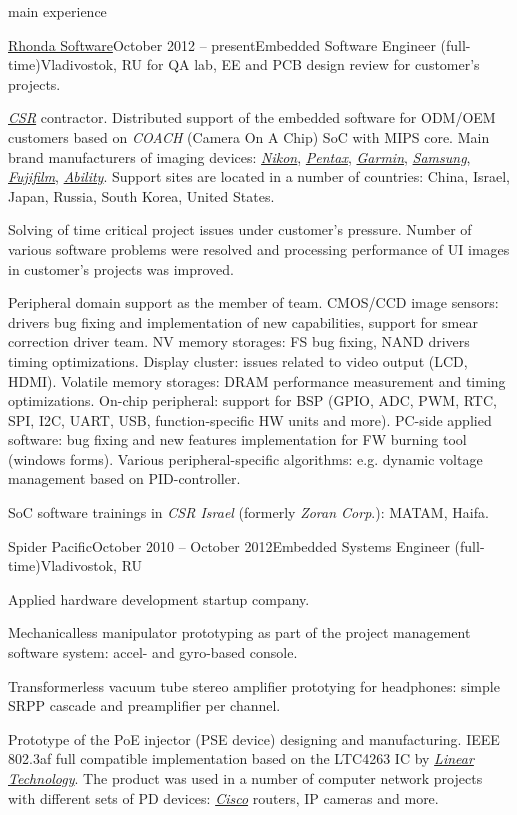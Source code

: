 \documentclass{template}
\begin{document}
\begin{rSection}{main experience}
\begin{rCompany}{\href{http://www.rhondasoftware.com}{Rhonda Software}}{October 2012 -- present}{Embedded Software Engineer (full-time)}{Vladivostok, RU}
      for QA lab, EE and PCB design review for customer's projects.
\item \href{http://www.csr.com}{\textit{CSR}} contractor. Distributed support of the embedded software for ODM/OEM customers based on \textit{COACH}
      (Camera On A Chip) SoC with MIPS core.
      Main brand manufacturers of imaging devices: \href{http://www.nikon.com}{\textit{Nikon}}, \href{http://www.pentax.com}{\textit{Pentax}},
      \href{http://www.garmin.com}{\textit{Garmin}}, \href{http://www.samsung.com}{\textit{Samsung}}, \href{http://www.fujifilm.com}{\textit{Fujifilm}},
      \href{http://www.abilitycorp.com.tw}{\textit{Ability}}. Support sites are located in a number of countries: China, Israel, Japan, Russia,
      South Korea, United States.
\item Solving of time critical project issues under customer's pressure. Number of various  software problems were resolved
      and processing performance of UI images in customer's projects was improved.
\item Peripheral domain support as the member of team. CMOS/CCD image sensors: drivers bug fixing and implementation of new capabilities, support
      for smear correction driver team. NV memory storages: FS bug fixing, NAND drivers timing optimizations. Display cluster: issues
      related to video output (LCD, HDMI). Volatile memory storages: DRAM performance measurement and timing optimizations. On-chip peripheral:
      support for BSP (GPIO, ADC, PWM, RTC, SPI, I2C, UART, USB, function-specific HW units and more). PC-side applied software: bug
      fixing and new features implementation for FW burning tool (windows forms). Various peripheral-specific algorithms: e.g. dynamic
      voltage management based on PID-controller.
\item SoC software trainings in \textit{CSR Israel} (formerly \textit{Zoran Corp}.): MATAM, Haifa.

\end{rCompany}
\begin{rCompany}{Spider Pacific}{October 2010 -- October 2012}{Embedded Systems Engineer (full-time)}{Vladivostok, RU}

\item Applied hardware development startup company.
\item Mechanicalless manipulator prototyping as part of the project management software system: accel- and gyro-based console.
\item Transformerless vacuum tube stereo amplifier prototying for headphones: simple SRPP cascade and preamplifier per channel.
\item Prototype of the PoE injector (PSE device) designing and manufacturing. IEEE 802.3af full compatible implementation based on the LTC4263 IC by
      \href{http://www.linear.com}{\textit{Linear Technology}}. The product was used in a number of computer network projects with different
      sets of PD devices: \href{http://www.cisco.com}{\textit{Cisco}} routers, IP cameras and more.


\end{rCompany}
\end{rSection}
\end{document}

